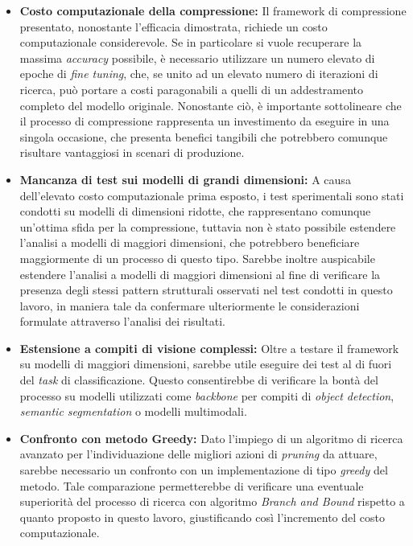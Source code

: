 \begin{itemize}
    \item \textbf{Costo computazionale della compressione:} Il framework di compressione presentato, nonostante l'efficacia dimostrata, richiede un costo computazionale considerevole. Se in particolare si vuole recuperare la massima \textit{accuracy} possibile, è necessario utilizzare un numero elevato di epoche di \textit{fine tuning}, che, se unito ad un elevato numero di iterazioni di ricerca, può portare a costi paragonabili a quelli di un addestramento completo del modello originale. Nonostante ciò, è importante sottolineare che il processo di compressione rappresenta un investimento da eseguire in una singola occasione, che presenta benefici tangibili che potrebbero comunque risultare vantaggiosi in scenari di produzione.
    
    \item \textbf{Mancanza di test sui modelli di grandi dimensioni:} A causa dell'elevato costo computazionale prima esposto, i test sperimentali sono stati condotti su modelli di dimensioni ridotte, che rappresentano comunque un'ottima sfida per la compressione, tuttavia non è stato possibile estendere l'analisi a modelli di maggiori dimensioni, che potrebbero beneficiare maggiormente di un processo di questo tipo. Sarebbe inoltre auspicabile estendere l'analisi a modelli di maggiori dimensioni al fine di verificare la presenza degli stessi pattern strutturali osservati nel test condotti in questo lavoro, in maniera tale da confermare ulteriormente le considerazioni formulate attraverso l'analisi dei risultati.

    \item \textbf{Estensione a compiti di visione complessi:} Oltre a testare il framework su modelli di maggiori dimensioni, sarebbe utile eseguire dei test al di fuori del \textit{task} di classificazione. Questo consentirebbe di verificare la bontà del processo su modelli utilizzati come \textit{backbone} per compiti di \textit{object detection}, \textit{semantic segmentation} o modelli multimodali.
    
    \item \textbf{Confronto con metodo Greedy:} Dato l'impiego di un algoritmo di ricerca avanzato per l'individuazione delle migliori azioni di \textit{pruning} da attuare, sarebbe necessario un confronto con un implementazione di tipo \textit{greedy} del metodo. Tale comparazione permetterebbe di verificare una eventuale superiorità del processo di ricerca con algoritmo \textit{Branch and Bound} rispetto a quanto proposto in questo lavoro, giustificando così l'incremento del costo computazionale.


\end{itemize}
